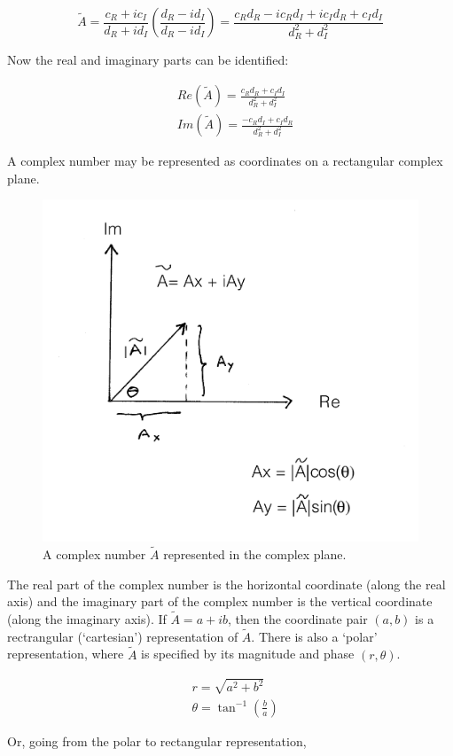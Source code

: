 \documentclass[12pt]{article}
\begin{document}
\begin{flushleft}
\[
\tilde{A}=\frac{c_{R}+ic_{I}}{d_{R}+id_{I}} \left( \frac{d_{R}-id_{I}}{d_{R}-id_{I}} \right) = \frac{c_{R}d_{R}-ic_{R}d_{I}+ic_{I}d_{R}+c_{I}d_{I} }{d_{R}^{2}+d_{I}^{2}}
\]

Now the real and imaginary parts can be identified:

\begin{equation*}
\begin{aligned}
& Re(\tilde{A}) = \frac{ c_{R}d_{R}+c_{I}d_{I} }{ d_{R}^{2}+d_{I}^{2} } \\
& Im(\tilde{A}) = \frac{ -c_{R}d_{I}+c_{I}d_{R} }{ d_{R}^{2}+d_{I}^{2} }
\end{aligned}
\end{equation*}

A complex number may be represented as coordinates on a rectangular complex plane.  

\begin{figure}[h]
\centering
\includegraphics*[trim=0cm 0cm 0cm 0cm, clip=true, width=0.4\columnwidth]{complex_pic.png}
\caption{\small A complex number $\tilde{A}$ represented in the complex plane.}
\label{fig:complexplane}
\end{figure}

The real part of the complex number is the horizontal coordinate (along the real axis) and the imaginary part of the complex number is the vertical coordinate (along the imaginary axis).  If $\tilde{A}=a+ib$, then the coordinate pair $(a,b)$ is a rectrangular (`cartesian') representation of $\tilde{A}$.  There is also a `polar' representation, where $\tilde{A}$ is specified by its magnitude and phase $(r,\theta)$.

\begin{equation*}
\begin{aligned}
& r = \sqrt{a^{2}+b^{2}} \\
& \theta = \tan^{-1}{\left( \frac{b}{a} \right)}
\end{aligned}
\end{equation*}

Or, going from the polar to rectangular representation,


\end{flushleft}
\end{document}
